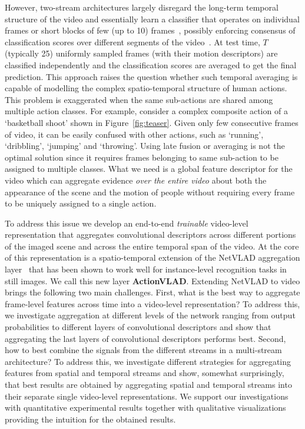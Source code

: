 \documentclass[10pt,twocolumn,letterpaper]{article}
\newcommand{\methodTag}[0]{ActionVLAD}
\begin{document}
However, two-stream architectures largely disregard the long-term  temporal structure of the video and essentially learn a classifier that operates on individual frames or short blocks of few (up to 10) frames~\cite{Simonyan_14b}, possibly enforcing consensus of classification scores  over different segments of the video~\cite{WangL_16a}.
At test time, $T$ (typically 25) uniformly  sampled frames (with their motion descriptors) are classified independently and the classification scores are averaged to get the final prediction. 
This approach raises the question whether such temporal averaging is capable of modelling the complex
spatio-temporal structure of human actions. This problem is exaggerated
when the same sub-actions are
shared among multiple action classes.
For example,  consider a complex composite action of a `basketball shoot' shown in Figure~\ref{fig:teaser}.
Given only few consecutive frames of video, it can be easily confused with 
other actions, such as `running', `dribbling', `jumping' and `throwing'.
Using late fusion or averaging is not the optimal solution since it requires frames belonging to same sub-action to be assigned to multiple classes. What we need is a  global feature descriptor for the video which can  aggregate evidence {\em over the entire video} about both the appearance of the scene and the motion of people without requiring every frame to be uniquely assigned to a single action.


To address this issue we develop an end-to-end {\em trainable} video-level representation that aggregates convolutional descriptors across different portions of the imaged scene and across the entire temporal span of the video. At the core of this representation is a spatio-temporal extension of the NetVLAD aggregation layer~\cite{Arandjelovic16} that has been shown to work well 
for instance-level recognition tasks in still images. We call this new layer {\bf \methodTag{}}. 
Extending NetVLAD to video brings the following two main challenges.
First, what is the best way to aggregate frame-level features across time into a video-level representation? To address this, we investigate aggregation at different levels of the network ranging from output probabilities to different layers of convolutional descriptors and show that aggregating the last layers of convolutional descriptors performs best. 
Second, how to best combine the signals from the
different streams in a multi-stream architecture? To address this, we investigate different strategies for aggregating features from spatial and temporal streams and show, somewhat surprisingly, that best results are obtained by aggregating  spatial and temporal streams into their separate single video-level representations. 
We support our investigations with quantitative experimental results together with qualitative visualizations providing the intuition for the obtained results.
\end{document}
